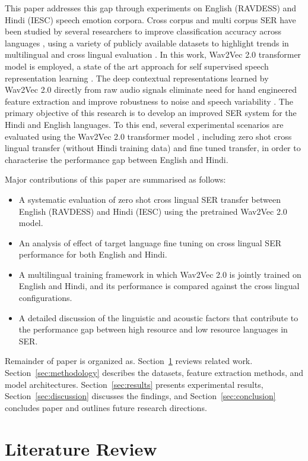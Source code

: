 \documentclass[runningheads]{llncs}
\begin{document}
This paper addresses this gap through experiments on English (RAVDESS) and Hindi (IESC) speech emotion corpora. Cross corpus and multi corpus SER have been studied by several researchers to improve classification accuracy across languages \cite{b7,b9}, using a variety of publicly available datasets to highlight trends in multilingual and cross lingual evaluation \cite{b1,b4}. In this work, Wav2Vec 2.0 transformer model is employed, a state of the art approach for self supervised speech representation learning \cite{b16,b23}. The deep contextual representations learned by Wav2Vec 2.0 directly from raw audio signals eliminate need for hand engineered feature extraction and improve robustness to noise and speech variability \cite{b16,b23}. The primary objective of this research is to develop an improved SER system for the Hindi and English languages. To this end, several experimental scenarios are evaluated using the Wav2Vec 2.0 transformer model \cite{b17}, including zero shot cross lingual transfer (without Hindi training data) and fine tuned transfer, in order to characterise the performance gap between English and Hindi.

Major contributions of this paper are summarised as follows:
\begin{itemize}
\item A systematic evaluation of zero shot cross lingual SER transfer between English (RAVDESS) and Hindi (IESC) using the pretrained Wav2Vec 2.0 model.
\item An analysis of effect of target language fine tuning on cross lingual SER performance for both English and Hindi.
\item A multilingual training framework in which Wav2Vec 2.0 is jointly trained on English and Hindi, and its performance is compared against the cross lingual configurations.
\item A detailed discussion of the linguistic and acoustic factors that contribute to the performance gap between high resource and low resource languages in SER.
\end{itemize}

Remainder of paper is organized as. Section~\ref{sec:related} reviews related work. Section~\ref{sec:methodology} describes the datasets, feature extraction methods, and model architectures. Section~\ref{sec:results} presents experimental results, Section~\ref{sec:discussion} discusses the findings, and Section~\ref{sec:conclusion} concludes paper and outlines future research directions.


\section{Literature Review}
\label{sec:related}
\end{document}
